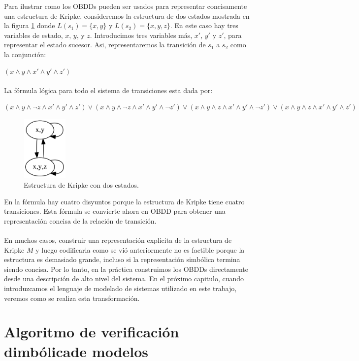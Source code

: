 Para ilustrar como los OBDDs pueden ser usados para representar concisamente una estructura de Kripke, consideremos la estructura de dos estados mostrada en la figura \ref{fig:kripke2} donde $L(s_{1}) = \{x,y\}$ y $L(s_{2}) = \{x,y,z\}$. En este caso hay tres variables de estado, $x$, $y$, y $z$. Introducimos tres variables más, $x'$, $y'$ y $z'$, para representar el estado sucesor. Asi, representaremos la transición de $s_{1}$ a $s_{2}$ como la conjunción:

$(x \land y \land x' \land y' \land z')$\\
\\
La fórmula lógica para todo el sistema de transiciones esta dada por:

$(x \land y \land \neg z \land x' \land y' \land z') \lor (x \land y \land \neg z \land x' \land y' \land \neg z') \lor (x \land y \land z \land x' \land y' \land \neg z') \lor (x \land y \land z \land x' \land y' \land z')$ 
\begin{figure}[H]
  \centering
  \includegraphics[width=0.2\textwidth]{Figures/kripke2.png}
  \caption{Estructura de Kripke con dos estados.}
  \label{fig:kripke2}
\end{figure}

\noindent En la fórmula hay cuatro disyuntos porque la estructura de Kripke tiene cuatro transiciones. Esta fórmula se convierte ahora en OBDD para obtener una representación concisa de la relación de transición.\\
\\
En muchos casos, construir una representación explicita de la estructura de Kripke $M$ y luego codificarla como se vió anteriormente no es factible porque la estructura es demasiado grande, incluso si la representación simbólica termina siendo concisa. Por lo tanto, en la práctica construimos los OBDDs directamente desde una descripción de alto nivel del sistema. En el próximo capitulo, cuando introduzcamos el lenguaje de modelado de sistemas utilizado en este trabajo, veremos como se realiza esta transformación.

\section{Algoritmo de verificación dimbólicade modelos}

